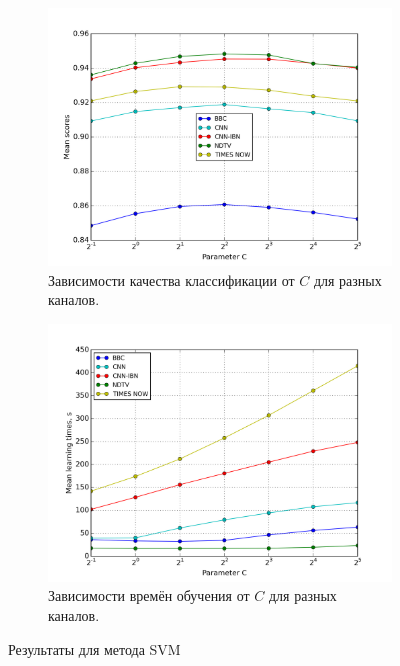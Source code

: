 \begin{figure}[h!]
    \centering
	\begin{subfigure}{0.45\textwidth}
		\includegraphics[width=\textwidth]{images/svm.png}
		\caption{Зависимости качества классификации от \(C\) для разных каналов.}
	\end{subfigure}
	\begin{subfigure}{0.45\textwidth}
		\includegraphics[width=\textwidth]{images/svmTime.png}
		\caption{Зависимости времён обучения от \(C\) для разных каналов.}
	\end{subfigure}
	\caption{Результаты для метода SVM}\label{fig:svm-base}
\end{figure}

